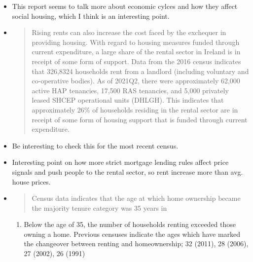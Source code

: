 \documentclass[11pt]{article}
\begin{document}
\begin{itemize}
  \begin{itemize}
  \item
    This report seems to talk more about economic cylces and how they
    affect social housing, which I think is an interesting point.
  \item
    \begin{quote}
    Rising rents can also increase the cost faced by the exchequer in
    providing housing. With regard to housing measures funded through
    current expenditure, a large share of the rental sector in Ireland
    is in receipt of some form of support. Data from the 2016 census
    indicates that 326,8324 households rent from a landlord (including
    voluntary and co-operative bodies). As of 2021Q2, there were
    approximately 62,000 active HAP tenancies, 17,500 RAS tenancies, and
    5,000 privately leased SHCEP operational units (DHLGH). This
    indicates that approximately 26\% of households residing in the
    rental sector are in receipt of some form of housing support that is
    funded through current expenditure.
    \end{quote}
  \item
    Be interesting to check this for the most recent census.
  \item
    Interesting point on how more strict mortgage lending rules affect
    price signals and push people to the rental sector, so rent increase
    more than avg. house prices.
  \item
    \begin{quote}
    Census data indicates that the age at which home ownership became
    the majority tenure category was 35 years in
    \end{quote}

    \begin{enumerate}
    \def\labelenumi{\arabic{enumi}.}
    \setcounter{enumi}{2015}
    \tightlist
    \item
      Below the age of 35, the number of households renting exceeded
      those owning a home. Previous censuses indicate the ages which
      have marked the changeover between renting and homeownership; 32
      (2011), 28 (2006), 27 (2002), 26 (1991)
    \end{enumerate}
  \end{itemize}
\end{itemize}
\end{document}
